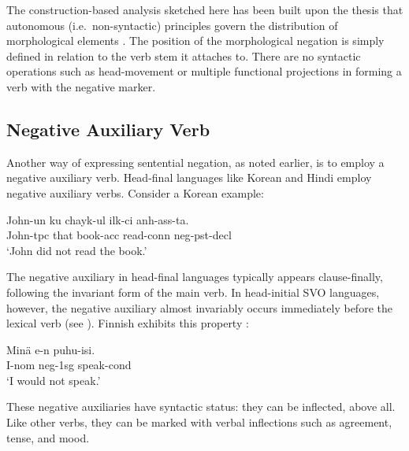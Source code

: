 \documentclass[output=paper]{langsci/langscibook}
\begin{document}
The construction-based analysis sketched here
  has been built upon the
thesis that autonomous (i.e.\ non-syntactic) principles govern the
distribution of morphological elements \citet{BM:95}.
The position of the morphological negation is simply
defined in relation to
the verb stem it attaches to. There are no syntactic operations such
as head-movement or multiple functional projections in forming
a verb with the negative marker.



\subsection{Negative Auxiliary Verb}

Another way of expressing sentential negation, as noted earlier, is to employ
a negative auxiliary
verb. Head-final languages like Korean and Hindi employ
negative auxiliary verbs. Consider a Korean example:

%



\begin{exe}
\ex \gll John-un ku chayk-ul ilk-ci anh-ass-ta. \\
John-{\sc tpc} that book-{\sc acc} read-{\sc conn} {\sc neg}-{\sc pst}-{\sc decl}  \\
`John did not read the book.'
\end{exe}

\noindent
The negative auxiliary in head-final languages
typically appears
clause-finally, following the invariant form of the main verb.
In head-initial SVO languages, however, the negative auxiliary
almost invariably occurs immediately before the lexical verb
(see \citet{Payne:85}). Finnish exhibits this property \citep{Mitchell:91}:

\begin{exe}
\ex \gll Min\"{a} e-n puhu-isi. \\
I-{\sc nom} {\sc neg}-{\sc 1sg} speak-{\sc cond} \\
`I would not speak.'
\end{exe}


\noindent
These negative auxiliaries have syntactic status: they can be
inflected, above all. Like other verbs, they can be marked
with verbal inflections such as agreement, tense, and mood.
\end{document}
